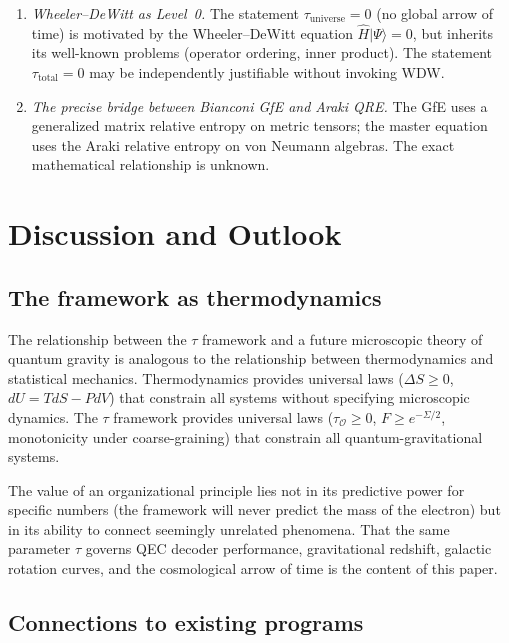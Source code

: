 \documentclass[prd,twocolumn,superscriptaddress,longbibliography,floatfix]{revtex4-2}
\newcommand{\tauasym}{\tau}
\newcommand{\tauO}{\tauasym_{\mathcal{O}}}
\begin{document}
\begin{enumerate}
\item \emph{Wheeler--DeWitt as Level~0.}
  The statement $\tauasym_{\mathrm{universe}} = 0$
  (no global arrow of time) is motivated by the
  Wheeler--DeWitt equation $\hat{H}|\Psi\rangle = 0$,
  but inherits its well-known problems (operator
  ordering, inner product).  The statement
  $\tauasym_{\mathrm{total}} = 0$ may be
  independently justifiable without invoking WDW.

\item \emph{The precise bridge between Bianconi GfE
  and Araki QRE.}
  The GfE uses a generalized matrix relative entropy
  on metric tensors; the master equation uses the
  Araki relative entropy on von Neumann algebras.
  The exact mathematical relationship is unknown.
\end{enumerate}


\section{Discussion and Outlook}
\label{sec:discussion}

\subsection{The framework as thermodynamics}

The relationship between the $\tauasym$ framework and
a future microscopic theory of quantum gravity is
analogous to the relationship between thermodynamics
and statistical mechanics.  Thermodynamics provides
universal laws ($\Delta S \geq 0$,
$dU = TdS - PdV$) that constrain all systems without
specifying microscopic dynamics.  The $\tauasym$
framework provides universal laws
($\tauO \geq 0$, $F \geq e^{-\Sigma/2}$,
monotonicity under coarse-graining) that constrain
all quantum-gravitational systems.

The value of an organizational principle lies not in
its predictive power for specific numbers (the
framework will never predict the mass of the electron)
but in its ability to connect seemingly unrelated
phenomena.  That the same parameter $\tauasym$ governs
QEC decoder performance, gravitational redshift,
galactic rotation curves, and the cosmological arrow
of time is the content of this paper.

\subsection{Connections to existing programs}
\end{document}
